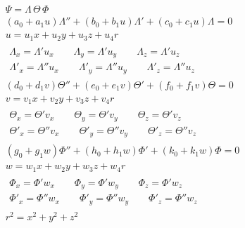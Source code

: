 \documentclass{article}
\theoremstyle{definition}
\theoremstyle{plain}
\begin{document}
\begin{subequations}
\label{separation ansatz}
\begin{gather}
\Psi = \Lambda\,\Theta\,\Phi \label{separation ansatz:product} \\
(a_0 + a_1 u) \Lambda'' + (b_0 + b_1 u) \Lambda' + (c_0 + c_1 u) \Lambda = 0 \label{separation ansatz:L} \\
u = u_1 x + u_2 y + u_3 z + u_4 r \label{separation ansatz:u} \\
\begin{gathered}
\Lambda_x = \Lambda' u_x \qquad \Lambda_y = \Lambda' u_y \qquad \Lambda_z = \Lambda' u_z \\
\Lambda'_x = \Lambda'' u_x \qquad \Lambda'_y = \Lambda'' u_y \qquad \Lambda'_z = \Lambda'' u_z
\end{gathered} \label{separation ansatz:Lchain} \\
(d_0 + d_1 v) \Theta'' + (e_0 + e_1 v) \Theta' + (f_0 + f_1 v) \Theta = 0 \label{separation ansatz:T} \\
v = v_1 x + v_2 y + v_3 z + v_4 r \label{separation ansatz:v} \\
\begin{gathered}
\Theta_x = \Theta' v_x \qquad \Theta_y = \Theta' v_y \qquad \Theta_z = \Theta' v_z \\
\Theta'_x = \Theta'' v_x \qquad \Theta'_y = \Theta'' v_y \qquad \Theta'_z = \Theta'' v_z
\end{gathered} \label{separation ansatz:Tchain} \\
(g_0 + g_1 w) \Phi'' + (h_0 + h_1 w) \Phi' + (k_0 + k_1 w) \Phi = 0 \label{separation ansatz:P} \\
w = w_1 x + w_2 y + w_3 z + w_4 r \label{separation ansatz:w} \\
\begin{gathered}
\Phi_x = \Phi' w_x \qquad \Phi_y = \Phi' w_y \qquad \Phi_z = \Phi' w_z \\
\Phi'_x = \Phi'' w_x \qquad \Phi'_y = \Phi'' w_y \qquad \Phi'_z = \Phi'' w_z
\end{gathered} \label{separation ansatz:Pchain} \\
r^2 = x^2 + y^2 + z^2
\end{gather}
\end{subequations}

\vfill\eject
\end{document}

